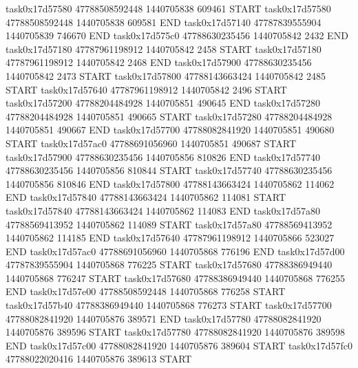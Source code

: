 task0x17d57580 47788508592448          1440705838               609461  START
task0x17d57580 47788508592448          1440705838               609581  END
task0x17d57140 47787839555904          1440705839               746670  END
task0x17d575c0 47788630235456          1440705842                 2432  END
task0x17d57180 47787961198912          1440705842                 2458  START
task0x17d57180 47787961198912          1440705842                 2468  END
task0x17d57900 47788630235456          1440705842                 2473  START
task0x17d57800 47788143663424          1440705842                 2485  START
task0x17d57640 47787961198912          1440705842                 2496  START
task0x17d57200 47788204484928          1440705851               490645  END
task0x17d57280 47788204484928          1440705851               490665  START
task0x17d57280 47788204484928          1440705851               490667  END
task0x17d57700 47788082841920          1440705851               490680  START
task0x17d57ac0 47788691056960          1440705851               490687  START
task0x17d57900 47788630235456          1440705856               810826  END
task0x17d57740 47788630235456          1440705856               810844  START
task0x17d57740 47788630235456          1440705856               810846  END
task0x17d57800 47788143663424          1440705862               114062  END
task0x17d57840 47788143663424          1440705862               114081  START
task0x17d57840 47788143663424          1440705862               114083  END
task0x17d57a80 47788569413952          1440705862               114089  START
task0x17d57a80 47788569413952          1440705862               114185  END
task0x17d57640 47787961198912          1440705866               523027  END
task0x17d57ac0 47788691056960          1440705868               776196  END
task0x17d57d00 47787839555904          1440705868               776225  START
task0x17d57680 47788386949440          1440705868               776247  START
task0x17d57680 47788386949440          1440705868               776255  END
task0x17d57e00 47788508592448          1440705868               776258  START
task0x17d57b40 47788386949440          1440705868               776273  START
task0x17d57700 47788082841920          1440705876               389571  END
task0x17d57780 47788082841920          1440705876               389596  START
task0x17d57780 47788082841920          1440705876               389598  END
task0x17d57c00 47788082841920          1440705876               389604  START
task0x17d57fc0 47788022020416          1440705876               389613  START
